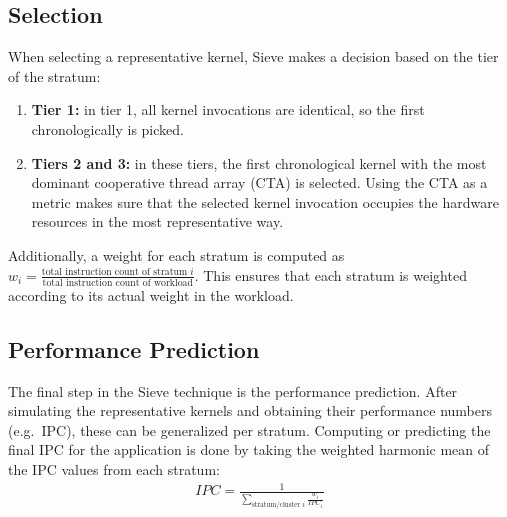 \subsection{Selection}\label{subsec:selection}
When selecting a representative kernel, Sieve makes a decision based on the tier of the stratum:
\begin{enumerate}
    \item \textbf{Tier 1:} in tier 1, all kernel invocations are identical, so the first chronologically is picked.
    \item \textbf{Tiers 2 and 3:} in these tiers, the first chronological kernel with the most dominant cooperative thread array (CTA) is selected.
    Using the CTA as a metric makes sure that the selected kernel invocation occupies the hardware resources in the most representative way.
\end{enumerate}
Additionally, a weight for each stratum is computed as $w_i = \frac{\text{total instruction count of stratum }i}{\text{total instruction count of workload}}$.
This ensures that each stratum is weighted according to its actual weight in the workload.

\subsection{Performance Prediction}\label{subsec:pref-pred}
The final step in the Sieve technique is the performance prediction.
After simulating the representative kernels and obtaining their performance numbers (e.g.\ IPC), these can be generalized per stratum.
Computing or predicting the final IPC for the application is done by taking the weighted harmonic mean of the IPC values from each stratum:
\begin{align*}
    IPC = \frac{1}{\sum_{\text{stratum/cluster } i}{\frac{w_i}{IPC_i}}}
\end{align*}

